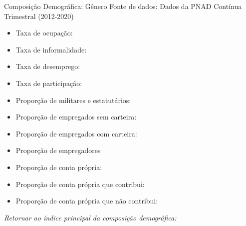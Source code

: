\begin{frame}[label=_composicao_demografica_genero]{Composição Demográfica: Gênero}
{\footnotesize Fonte de dados: Dados da PNAD Contínua Trimestral (2012-2020)}
\begin{itemize}
\item{Taxa de ocupação: \hyperlink{_composicao_demografica_genero_taxa_de_ocupacao}{}}
\item{Taxa de informalidade: \hyperlink{_composicao_demografica_genero_taxa_de_informalidade}{}}
\item{Taxa de desemprego: \hyperlink{_composicao_demografica_genero_taxa_de_desemprego}{}}
\item{Taxa de participação: \hyperlink{_composicao_demografica_genero_taxa_de_participacao}{}}
\item{Proporção de militares e estatutários: \hyperlink{_composicao_demografica_genero_prop_militar}{}}
\item{Proporção de empregados sem carteira: \hyperlink{_composicao_demografica_genero_prop_empregadoSC}{}}
\item{Proporção de empregados com carteira: \hyperlink{_composicao_demografica_genero_prop_empregadoCC}{}}
\item{Proporção de empregadores \hyperlink{_composicao_demografica_genero_prop_empregador}{}}
\item{Proporção de conta própria: \hyperlink{_composicao_demografica_genero_prop_cpropria}{}}
\item{Proporção de conta própria que contribui: \hyperlink{_composicao_demografica_genero_prop_cpropriaC}{}}
\item{Proporção de conta própria que não contribui: \hyperlink{_composicao_demografica_genero_prop_cpropriaNc}{}}
\end{itemize}

\begin{small}
\textit{Retornar ao índice principal da composição demográfica: \hyperlink{_composicao_demografica}{} }
\end{small}

\end{frame}

